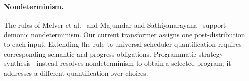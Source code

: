 \paragraph{Nondeterminism.}
The rules of McIver et al.~\cite{10.1145/3158121} and Majumdar and
Sathiyanarayana~\cite{DBLP:journals/pacmpl/MajumdarS25} support
demonic nondeterminism. Our current
transformer assigns one post-distribution to each input. Extending the
rule to universal scheduler quantification requires corresponding
semantic and progress obligations. Programmatic strategy
synthesis~\cite{DBLP:journals/pacmpl/BatzBKW24} instead resolves
nondeterminism to obtain a selected program; it addresses a different
quantification over choices.
